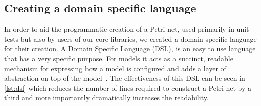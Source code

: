 \subsection{Creating a domain specific language}
In order to aid the programmatic creation of a Petri net, used primarily in unit-tests but also by users of our core libraries, we created a domain specific language for their creation. A Domain Specific Language (DSL), is an easy to use language that has a 
very specific purpose. For models it acts as a succinct, 
readable mechanism for expressing how a model is configured and adds a
layer of abstraction on top of the model~\cite{fowler2010domain}. The effectiveness of this DSL can be seen in \cref{lst:dsl} which reduces the number of lines required to construct a Petri net by a third and more importantly dramatically increases the readability.


